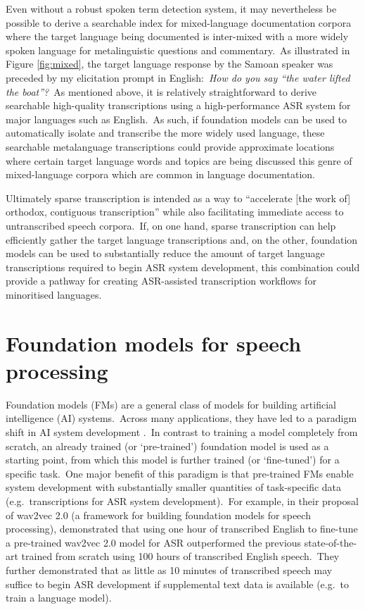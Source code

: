\documentclass[main.tex]{subfiles}
\begin{document}
Even without a robust spoken term detection system, it may nevertheless be possible to derive a searchable index for mixed-language documentation corpora where the target language being documented is inter-mixed with a more widely spoken language for metalinguistic questions and commentary.~As illustrated in Figure \ref{fig:mixed}, the target language response by the Samoan speaker was preceded by my elicitation prompt in English:~\textit{How do you say ``the water lifted the boat''?}~As mentioned above, it is relatively straightforward to derive searchable high-quality transcriptions using a high-performance ASR system for major languages such as English.~As such, if foundation models can be used to automatically isolate and transcribe the more widely used language, these searchable metalanguage transcriptions could provide approximate locations where certain target language words and topics are being discussed this genre of mixed-language corpora which are common in language documentation.

Ultimately sparse transcription is intended as a way to ``accelerate [the work of] orthodox, contiguous transcription'' \parencite[p.~737]{bird-2020-sparse} while also facilitating immediate access to untranscribed speech corpora.~If, on one hand, sparse transcription can help efficiently gather the target language transcriptions and, on the other, foundation models can be used to substantially reduce the amount of target language transcriptions required to begin ASR system development, this combination could provide a pathway for creating ASR-assisted transcription workflows for minoritised languages.

\section{Foundation models for speech processing}

Foundation models (FMs) are a general class of models for building artificial intelligence (AI) systems.~Across many applications, they have led to a paradigm shift in AI system development \parencite{bommasani2021opportunities}.~In contrast to training a model completely from scratch, an already trained (or `pre-trained') foundation model is used as a starting point, from which this model is further trained (or `fine-tuned') for a specific task.~One major benefit of this paradigm is that pre-trained FMs enable system development with substantially smaller quantities of task-specific data (e.g.~transcriptions for ASR system development).~For example, in their proposal of wav2vec 2.0 (a framework for building foundation models for speech processing), \textcite{NEURIPS2020_92d1e1eb} demonstrated that using one hour of transcribed English to fine-tune a pre-trained wav2vec 2.0 model for ASR outperformed the previous state-of-the-art trained from scratch using 100 hours of transcribed English speech.~They further demonstrated that as little as 10 minutes of transcribed speech may suffice to begin ASR development if supplemental text data is available (e.g.~to train a language model).
\end{document}
